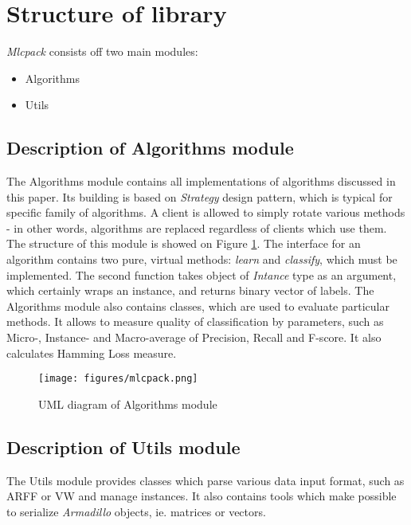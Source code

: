 \section{Structure of library}

\textit{Mlcpack} consists off two main modules:
\begin{itemize}
\item Algorithms
\item Utils
\end{itemize}

\subsection{Description of Algorithms module}

The Algorithms module contains all implementations of algorithms discussed in this paper. Its building is based on \textit{Strategy} design pattern, which is typical for specific family of algorithms. A client is allowed to simply rotate various methods - in other words, algorithms are replaced regardless of clients which use them. The structure of this module is showed on Figure \ref{fig:alg_sh}. 
The interface for an algorithm contains two pure, virtual methods: \textit{learn} and \textit{classify}, which must be implemented. The second function takes object of \textit{Intance} type as an argument, which certainly wraps an instance, and returns binary vector of labels. The Algorithms module also contains classes, which are used to evaluate particular methods. It allows to measure quality of classification by parameters, such as Micro-, Instance- and Macro-average of Precision, Recall and F-score. It also calculates Hamming Loss measure. 

\begin{figure}
\centering
\label{fig:alg_sh}
\caption{UML diagram of Algorithms module}
\texttt{[image: figures/mlcpack.png]}
\end{figure}

\subsection{Description of Utils module}

The Utils module provides classes which parse various data input format, such as ARFF or VW and manage instances. It also contains tools which make possible to serialize \textit{Armadillo} objects, ie. matrices or vectors.   
